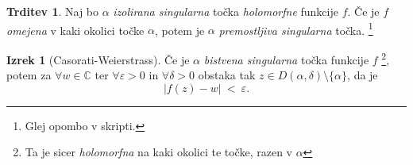 \documentclass[11pt]{article}
\theoremstyle{definition}
\theoremstyle{definition}
\newtheorem{trditev}{Trditev}[section]
\theoremstyle{definition}
\newtheorem{izrek}{Izrek}[section]
\begin{document}
\begin{trditev}

Naj bo $\alpha$ \textit{izolirana singularna} točka \textit{holomorfne} funkcije $f$. Če je $f$ \textit{omejena} v kaki okolici točke $\alpha$, potem je $\alpha$ \textit{premostljiva singularna} točka. \footnote{Glej opombo v skripti.}

\end{trditev}
\vspace{0.5cm}

\begin{izrek}[Casorati-Weierstrass]

Če je $\alpha$ \textit{bistvena singularna} točka funkcije $f$ \footnote{Ta je sicer \textit{holomorfna} na kaki okolici te točke, razen v $\alpha$}, potem za $\forall w \in \mathbb{C}$ ter $\forall \varepsilon > 0$ in $\forall \delta > 0$ obstaka tak $z \in D(\alpha, \delta) \setminus \{ \alpha \}$, da je 
$$|f(z) - w| ~<~ \varepsilon.$$ 

\end{izrek}
\vspace{0.5cm}


\pagebreak

\end{document}

